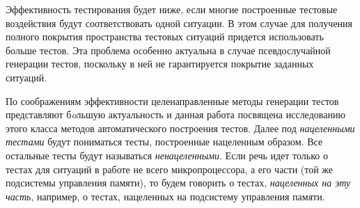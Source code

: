Эффективность тестирования будет ниже, если многие построенные тестовые воздействия будут соответствовать одной ситуации. В этом случае для получения полного покрытия пространства тестовых ситуаций придется использовать больше тестов. Эта проблема особенно актуальна в случае псевдослучайной генерации тестов, поскольку в ней не гарантируется покрытие заданных ситуаций.

По соображениям эффективности целенаправленные методы генерации тестов представляют б\textit{o}льшую актуальность и данная работа посвящена исследованию этого класса методов автоматического построения тестов. Далее под \emph{нацеленными тестами} будут пониматься тесты, построенные нацеленным образом. Все остальные тесты будут называться \emph{ненацеленными}. Если речь идет только о тестах для ситуаций в работе не всего микропроцессора, а его части (той же подсистемы управления памяти), то будем говорить о тестах, \emph{нацеленных на эту часть}, например, о тестах, нацеленных на подсистему управления памяти.





